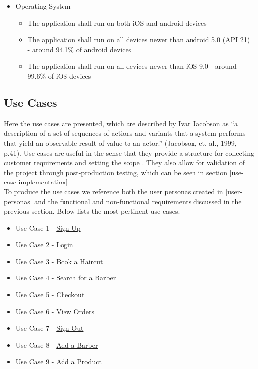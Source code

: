 \documentclass[12pt]{article}
\begin{document}
	\begin{itemize}
		\item Operating System
		\begin{itemize}
			\item The application shall run on both iOS and android devices
			\item The application shall run on all devices newer than android 5.0 (API 21) - around 94.1\% of android devices
			\item The application shall run on all devices newer than iOS 9.0 - around 99.6\% of iOS devices
		\end{itemize}
	\end{itemize}

	
	\subsection{Use Cases}
	Here the use cases are presented, which are described by Ivar Jacobson as “a description of a set of sequences of actions and variants that a system performs that yield an observable result of value to an actor.” (Jacobson, et. al., 1999, p.41). Use cases are useful in the sense that they provide a structure for collecting customer requirements and setting the scope \cite{larsonUseCasesWhat2004}. They also allow for validation of the project through post-production testing, which can be seen in section \autoref{use-case-implementation}.
	\\
	
	To produce the use cases we reference both the user personas created in \autoref{user-personas} and the functional and non-functional requirements discussed in the previous section. Below lists the most pertinent use cases.

	\begin{itemize}
		\item Use Case 1 - \textcolor{blue}{\hyperref[chap:use-cases-1]{Sign Up}}
		\item Use Case 2 - \textcolor{blue}{\hyperref[chap:use-cases-2]{Login}}
		\item Use Case 3 - \textcolor{blue}{\hyperref[chap:use-cases-3]{Book a Haircut}}
		\item Use Case 4 - \textcolor{blue}{\hyperref[chap:use-cases-4]{Search for a Barber}}
		\item Use Case 5 - \textcolor{blue}{\hyperref[chap:use-cases-5]{Checkout}}
		\item Use Case 6 - \textcolor{blue}{\hyperref[chap:use-cases-6]{View Orders}}
		\item Use Case 7 - \textcolor{blue}{\hyperref[chap:use-cases-7]{Sign Out}}
		\item Use Case 8 - \textcolor{blue}{\hyperref[chap:use-cases-8]{Add a Barber}}
		\item Use Case 9 - \textcolor{blue}{\hyperref[chap:use-cases-9]{Add a Product}}
	\end{itemize}
	
\end{document}
